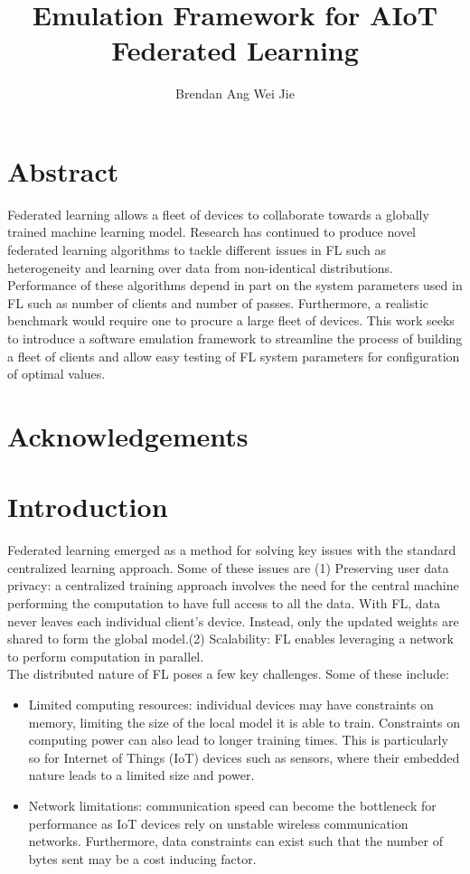 \documentclass[12pt]{article}
\title{Emulation Framework for AIoT Federated Learning}
\author{Brendan Ang Wei Jie}
\begin{document}
\maketitle

\pagebreak
\section{Abstract}
Federated learning allows a fleet of devices to collaborate towards a globally trained machine
learning model. Research has continued to produce novel federated learning algorithms to tackle
different issues in FL such as heterogeneity and learning over data from non-identical
distributions. Performance of these algorithms depend in part on the system parameters used in FL
such as number of clients and number of passes. Furthermore, a realistic benchmark would require
one to procure a large fleet of devices. This work seeks to introduce a software emulation framework to
streamline the process of building a fleet of clients and allow easy testing of FL system
parameters for configuration of optimal values.
\pagebreak
  \section{Acknowledgements}
\pagebreak
\tableofcontents
\listoffigures
\pagebreak

\section{Introduction}
Federated learning emerged as a method for solving key issues with the standard centralized learning
approach. Some of these issues are (1) Preserving user data privacy: a centralized training approach involves the need for the central
machine performing the computation to have full access to all the data. With FL, data never
leaves each individual client's device. Instead, only the updated weights are shared to form the
global model.(2) Scalability: FL enables leveraging a network to perform computation in parallel.
\\
The distributed nature of FL poses a few key challenges. Some of these include:
\begin{itemize}
  \item Limited computing resources: individual devices may have constraints on memory, limiting the
    size of the local model it is able to train. Constraints on computing power can also lead to
    longer training times. This is particularly so for Internet of Things (IoT) devices such as
    sensors, where their embedded nature leads to a limited size and power.
  \item Network limitations: communication speed can become the bottleneck for performance as IoT
    devices rely on unstable wireless communication networks. Furthermore, data constraints can
    exist such that the number of bytes sent may be a cost inducing factor.
\end{itemize}
\end{document}
